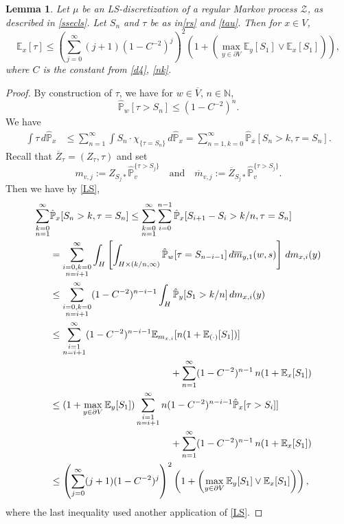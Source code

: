 \documentclass[12pt,a4paper]{amsart}
\numberwithin{equation}{section}
\newtheorem{lem}[equation]{Lemma}
\theoremstyle{definition}
\def\E{\mathbb E}
\def\N{\mathbb N}
\def\p{\mathbb P}
\begin{document}
\begin{lem}\label{ffmtau} Let $\mu$ be an LS-discretization of a regular Markov process $\mathcal Z$, as described in \cref{ssecls}.
Let $S_n$ and $\tau$ be as in\eqref{rs} and \eqref{tau}.
Then for $x\in V$,
\[\E_x[\tau]\leq \left(\sum_{j=0}^\infty(j+1)(1-C^{-2})^j\right)^2 \left(1+ \left(\max_{y\in \partial V}\E_y[S_1]\vee \E_x[S_1]\right)\right),
\]
where $C$ is the constant from \eqref{d4}, \eqref{nk}.
\end{lem}
\begin{proof}
By construction of $\tau$, we have for $w\in \overline{V}$, $n\in\N$, \begin{equation}\label{LS}\hat{\p}_w[\tau>S_n]\leq (1-C^{-2})^n.\end{equation}
We have
\begin{equation*}
\begin{split}
\int \tau \,d\hat{\p}_x & \leq \sum_{n=1}^\infty \int S_n\cdot \chi_{\{\tau=S_n\}}\,d\hat{\p}_x
= \sum_{n=1,k=0}^\infty \hat{\p}_x[S_{n}>k,\tau=S_n].
\end{split}
\end{equation*}
Recall that $\overline{Z}_\tau=(Z_\tau,\tau)$ and set $$m_{v,j}:=Z_{S_j\ast}\hat{\p}_v^{\{\tau>S_j\}}\quad \text{and}\quad \overline{m}_{v,j}:=\overline{Z}_{S_j\ast}\hat{\p}_v^{\{\tau>S_j\}}.$$
Then we have by \eqref{LS},
{\allowdisplaybreaks
\begin{align*}
\sum_{\substack{k=0\\ n=1}}^\infty &\hat{\p}_x[S_{n}>k,\tau=S_n]
\leq \sum_{\substack{k=0\\ n=1}}^\infty\sum_{i=0}^{n-1} \hat{\p}_x[S_{i+1}-S_i>k/n,\tau=S_n]\\
&= \sum_{\substack{i=0,k=0\\ n=i+1}}^\infty \int_H \left[\int_{H\times (k/n,\infty)} \hat{\p}_w[\tau=S_{n-i-1}]\,d\overline{m}_{y,1}(w,s)\right]\,dm_{x,i}(y) \\
&\leq \sum_{\substack{i=0,k=0\\ n=i+1}}^\infty  (1-C^{-2}) ^{n-i-1}\int_H \hat{\p}_y[S_1>k/n]\, dm_{x,i}(y)\\
&\leq \sum_{\substack{i=1\\ n=i+1}}^\infty  (1-C^{-2})^{n-i-1}\E_{m_{x,i}}[n(1+\E_{(\cdot)} [S_1])] \\
&\hspace{44mm}+\sum_{n=1}^\infty (1-C^{-2})^{n-1}\,n(1+\E_x[S_1])\\
&\leq (1+\max_{y\in\partial V}\E_y[S_1])\sum_{\substack{i=1\\ n=i+1}}^\infty  n(1-C^{-2})^{n-i-1} \hat{\p}_x[\tau>S_i]] \\
&\hspace{44mm}+\sum_{n=1}^\infty (1-C^{-2})^{n-1}\,n(1+\E_x[S_1])\\
&\leq \left(\sum_{j=0}^\infty (j+1)(1-C^{-2})^{j}\right)^2\left(1+ \left(\max_{y\in \partial V}\E_y[S_1]\vee \E_x[S_1]\right)\right),
\end{align*}
}
where the last inequality used another application of \eqref{LS}.
\end{proof}
\end{document}
